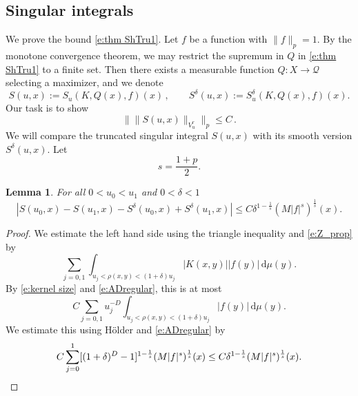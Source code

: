 \documentclass[12pt,reqno,a4paper,dvipsnames]{amsart}
\theoremstyle{plain}
\newtheorem{lemma}[theorem]{Lemma}
\theoremstyle{definition}
\numberwithin{theorem}{section}
\numberwithin{equation}{section}
\newcommand{\AD}{D}
\begin{document}
\subsection{Singular integrals}
We prove the bound \eqref{e:thm ShTru1}. 
Let $f$ be a function with $\|f\|_p = 1$.
By the monotone convergence theorem, we may restrict the supremum in $Q$ in \eqref{e:thm ShTru1} to a finite set. Then there exists a measurable function $Q: X \to \mathcal{Q}$ selecting a maximizer, and we denote
\begin{equation}\label{e:casetr}
    S(u,x) := S_u(K, Q(x), f)(x)\,, \qquad S^\delta(u,x) := S_u^\delta(K, Q(x), f)(x).
\end{equation}
Our task is to show
\begin{equation}
    \label{e:g bound}
    \|\|S(u,x)\|_{V^r_u}\|_{p}  \leq C\,. 
\end{equation}
We will compare the truncated singular integral $S(u,x)$ with its smooth version $S^\delta(u,x)$. Let
\[
    s = \frac{1 + p}{2}.
\]
\begin{lemma}
    \label{l:sing_comp}
    For all $0 < u_0 < u_1$ and $0 < \delta < 1$
    \begin{equation}
        \label{e:comp_tru}
        |S(u_0, x) - S(u_1,x) - S^\delta(u_0,x) + S^\delta(u_1,x)| \le C \delta^{1 -\frac{1}{s}} (M|f|^{s})^{\frac{1}{s}}(x). 
    \end{equation}
\end{lemma}

\begin{proof}
    We estimate the left hand side using the triangle inequality and \eqref{e:Z_prop} by 
    \[
        \sum_{j=0,1} \int_{u_j < \rho(x,y) < (1 + \delta)u_j} |K(x,y)| |f(y)| \, \mathrm{d}\mu(y).
    \]
    By \eqref{e:kernel size} and \eqref{e:ADregular}, this is at most
    \[
        C \sum_{j=0,1} u_j^{-\AD} \int_{u_j < \rho(x,y) < (1 + \delta)u_j} |f(y)| \, \mathrm{d}\mu(y).
    \]
    We estimate this using Hölder and \eqref{e:ADregular} by 
    \[
        C  \sum_{j=0}^1 [(1 + \delta)^\AD - 1]^{1 - \frac{1}{s}} (M |f|^s)^{\frac{1}{s}}(x) \le C \delta^{1 - \frac{1}{s}} (M |f|^s)^{\frac{1}{s}}(x). \qedhere
    \]
\end{proof}
\end{document}
